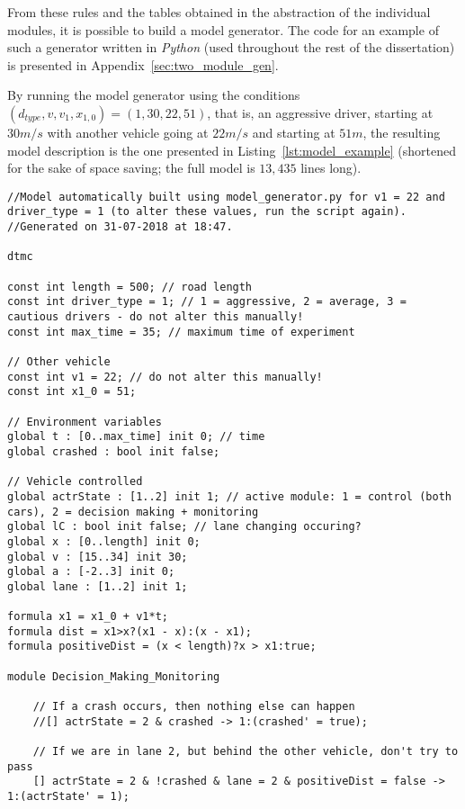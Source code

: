 From these rules and the tables obtained in the abstraction of the individual modules, it is possible to build a model generator. The code for an example of such a generator written in \textit{Python} (used throughout the rest of the dissertation) is presented in Appendix~\ref{sec:two_module_gen}. 

By running the model generator using the conditions $(d_{type}, v, v_1, x_{1,0}) = (1,30,22,51)$, that is, an aggressive driver, starting at $30m/s$ with another vehicle going at $22m/s$ and starting at $51m$, the resulting model description is the one presented in Listing~\ref{lst:model_example} (shortened for the sake of space saving; the full model is $13,435$ lines long).

{\vspace{1em}
\begin{lstlisting}[caption={Example of the model generated for the tuple $(d_{type}, v, v_1, x_{1,0}) = (1,30,22,51)$ (shortened)},captionpos=b,label={lst:model_example}]
//Model automatically built using model_generator.py for v1 = 22 and driver_type = 1 (to alter these values, run the script again).
//Generated on 31-07-2018 at 18:47.

dtmc

const int length = 500; // road length
const int driver_type = 1; // 1 = aggressive, 2 = average, 3 = cautious drivers - do not alter this manually!
const int max_time = 35; // maximum time of experiment

// Other vehicle
const int v1 = 22; // do not alter this manually!
const int x1_0 = 51;

// Environment variables
global t : [0..max_time] init 0; // time 
global crashed : bool init false; 

// Vehicle controlled
global actrState : [1..2] init 1; // active module: 1 = control (both cars), 2 = decision making + monitoring
global lC : bool init false; // lane changing occuring? 
global x : [0..length] init 0;
global v : [15..34] init 30;
global a : [-2..3] init 0;
global lane : [1..2] init 1;

formula x1 = x1_0 + v1*t;
formula dist = x1>x?(x1 - x):(x - x1);
formula positiveDist = (x < length)?x > x1:true;

module Decision_Making_Monitoring

 	// If a crash occurs, then nothing else can happen
	//[] actrState = 2 & crashed -> 1:(crashed' = true);

 	// If we are in lane 2, but behind the other vehicle, don't try to pass
	[] actrState = 2 & !crashed & lane = 2 & positiveDist = false -> 1:(actrState' = 1);


\end{lstlisting}}
